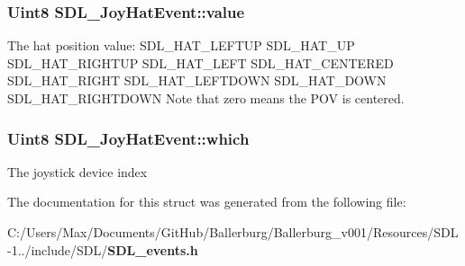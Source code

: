 \subsubsection[{value}]{\setlength{\rightskip}{0pt plus 5cm}Uint8 S\+D\+L\+\_\+\+Joy\+Hat\+Event\+::value}\label{struct_s_d_l___joy_hat_event_a52b179a34407449941b61d988ca72ef4}
The hat position value\+: S\+D\+L\+\_\+\+H\+A\+T\+\_\+\+L\+E\+F\+T\+U\+P S\+D\+L\+\_\+\+H\+A\+T\+\_\+\+U\+P S\+D\+L\+\_\+\+H\+A\+T\+\_\+\+R\+I\+G\+H\+T\+U\+P S\+D\+L\+\_\+\+H\+A\+T\+\_\+\+L\+E\+F\+T S\+D\+L\+\_\+\+H\+A\+T\+\_\+\+C\+E\+N\+T\+E\+R\+E\+D S\+D\+L\+\_\+\+H\+A\+T\+\_\+\+R\+I\+G\+H\+T S\+D\+L\+\_\+\+H\+A\+T\+\_\+\+L\+E\+F\+T\+D\+O\+W\+N S\+D\+L\+\_\+\+H\+A\+T\+\_\+\+D\+O\+W\+N S\+D\+L\+\_\+\+H\+A\+T\+\_\+\+R\+I\+G\+H\+T\+D\+O\+W\+N Note that zero means the P\+O\+V is centered. 
\subsubsection[{which}]{\setlength{\rightskip}{0pt plus 5cm}Uint8 S\+D\+L\+\_\+\+Joy\+Hat\+Event\+::which}\label{struct_s_d_l___joy_hat_event_a73ba3817ba1265f3878012c21462e74a}
The joystick device index 

The documentation for this struct was generated from the following file\+:\begin{DoxyCompactItemize}
\item 
C\+:/\+Users/\+Max/\+Documents/\+Git\+Hub/\+Ballerburg/\+Ballerburg\+\_\+v001/\+Resources/\+S\+D\+L-\/1../include/\+S\+D\+L/{\bf S\+D\+L\+\_\+events.\+h}\end{DoxyCompactItemize}
